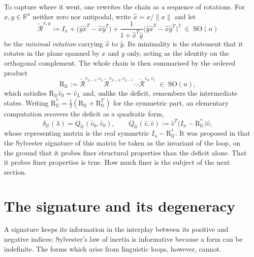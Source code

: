 \documentclass{article}
\theoremstyle{plain}
\theoremstyle{definition}
\numberwithin{equation}{section}
\newcommand{\R}{\mathbb{R}}
\newcommand{\SO}{\mathrm{SO}}
\newcommand{\Rmin}{\widetilde{\mathcal{R}}}
\newcommand{\Uc}{\mathcal{U}}
\begin{document}
To capture where it went, one rewrites the chain as a sequence of
rotations. For $x,y \in \R^n$ neither zero nor antipodal, write
$\hat{x} = x/\|x\|$ and let
\begin{equation}\label{eq:minrot}
\Rmin^{x,y} := I_n + \bigl(\hat{y}\hat{x}^T - \hat{x}\hat{y}^T\bigr)
+ \frac{1}{1 + \hat{x}^T\hat{y}}
\bigl(\hat{y}\hat{x}^T - \hat{x}\hat{y}^T\bigr)^2 \; \in \; \SO(n)
\end{equation}
be the \emph{minimal rotation} carrying $\hat{x}$ to $\hat{y}$. Its
minimality is the statement that it rotates in the plane spanned by $x$
and $y$ only, acting as the identity on the orthogonal complement. The
whole chain is then summarised by the ordered product
\begin{equation}\label{eq:loopmatrix}
\mathrm{R}_\Uc := \Rmin^{v_{L-1},v_L} \Rmin^{v_{L-2},v_{L-1}}
\cdots \Rmin^{v_0,v_1} \; \in \; \SO(n),
\end{equation}
which satisfies $\mathrm{R}_\Uc \hat{v}_0 = \hat{v}_L$ and, unlike the
deficit, remembers the intermediate states. Writing
$\mathrm{R}^{*}_\Uc = \tfrac12(\mathrm{R}_\Uc + \mathrm{R}_\Uc^T)$ for
the symmetric part, an elementary computation recovers the deficit as a
quadratic form,
\begin{equation}\label{eq:quadform}
\delta_\Uc(\lambda) = Q_\Uc(\hat{v}_0,\hat{v}_0),
\qquad
Q_\Uc(\hat{v},\hat{v}) := \hat{v}^T
\bigl(I_n - \mathrm{R}^{*}_\Uc\bigr)\hat{v},
\end{equation}
whose representing matrix is the real symmetric
$I_n - \mathrm{R}^{*}_\Uc$. It was proposed in \cite{CM25} that the
Sylvester signature of this matrix be taken as the invariant of the
loop, on the ground that it probes finer structural properties than the
deficit alone. That it probes finer properties is true. How much finer
is the subject of the next section.

\section{The signature and its degeneracy}\label{sec:signature}

A signature keeps its information in the interplay between its positive
and negative indices; Sylvester's law of inertia is informative because
a form can be indefinite. The forms which arise from linguistic loops,
however, cannot.
\end{document}
